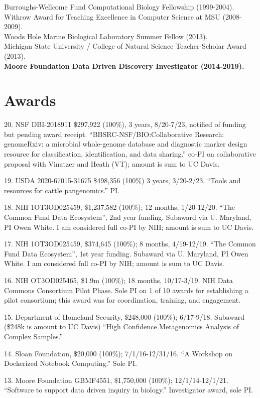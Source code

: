 \documentclass[margin,line]{resume}
\begin{document}
\begin{resume}
Burroughs-Wellcome Fund Computational Biology Fellowship (1999-2004).\\
Withrow Award for Teaching Excellence in Computer Science at MSU (2008-2009). \\
Woods Hole Marine Biological Laboratory Summer Fellow (2013).\\
Michigan State University / College of Natural Science Teacher-Scholar Award (2013).\\
{\bf Moore Foundation Data Driven Discovery Investigator (2014-2019).}


\section{\mysidestyle Awards}

20. NSF DBI-2018911 \$297,922 (100\%), 3 years, 8/20-7/23, notified of funding but pending award receipt. ``BBSRC-NSF/BIO:Collaborative Research: genomeRxiv: a microbial whole-genome database and diagnostic marker design resource for classification, identification, and data sharing.'' co-PI on collaborative proposal with Vinatzer and Heath (VT); amount is sum to UC Davis.

19. USDA 2020-67015-31675 \$498,356 (100\%) 3 years, 3/20-2/23. ``Tools and resources for cattle pangenomics.'' PI.

18. NIH 1OT3OD025459, \$1,237,582 (100\%); 12 months, 1/20-12/20. ``The Common Fund Data Ecosystem'', 2nd year funding. Subaward via U. Maryland, PI Owen White. I am considered full co-PI by NIH; amount is sum to UC Davis.

17. NIH 1OT3OD025459, \$374,645 (100\%); 8 months, 4/19-12/19. ``The Common Fund Data Ecosystem'', 1st year funding. Subaward via U. Maryland, PI Owen White. I am considered full co-PI by NIH; amount is sum to UC Davis.

16. NIH OT3OD025465, \$1.9m (100\%); 18 months, 10/17-3/19. NIH Data Commons Consortium Pilot Phase. Sole PI on 1 of 10 awards for establishing a pilot consortium; this award was for coordination, training, and engagement.

15. Department of Homeland Security, \$248,000 (100\%); 6/17-9/18. Subaward (\$248k is amount to UC Davis) ``High Confidence Metagenomics Analysis of Complex Samples.''

14. Sloan Foundation, \$20,000 (100\%); 7/1/16-12/31/16. ``A Workshop on Dockerized Notebook Computing.'' Sole PI.

13. Moore Foundation GBMF4551, \$1,750,000 (100\%); 12/1/14-12/1/21.  ``Software to support data driven inquiry in biology.'' Investigator award, sole PI.


\end{resume}
\end{document}
